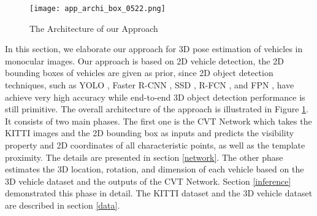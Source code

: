 \begin{figure}[h]		
	\texttt{[image: app\_archi\_box\_0522.png]}
	\caption{The Architecture of our Approach}
	\centering
	\label{figure:app_archi}
\end{figure}

In this section, we elaborate our approach for 3D pose estimation of vehicles in monocular images. Our approach is based on 2D vehicle detection, \ie the 2D bounding boxes of vehicles are given as prior, since 2D object detection techniques, such as YOLO \cite{DBLP:journals/corr/RedmonF16}, Faster R-CNN \cite{DBLP:journals/corr/RenHG015}, SSD \cite{DBLP:journals/corr/LiuAESR15}, R-FCN \cite{DBLP:journals/corr/DaiLHS16}, and FPN \cite{DBLP:journals/corr/LinDGHHB16},  have achieve very high accuracy while  end-to-end 3D object detection performance is still primitive.  The overall architecture of the approach is illustrated in Figure \ref{figure:app_archi}. It consists of two main phases. The first one is the CVT Network which takes the KITTI images and the 2D bounding box as inputs and predicts the visibility property and 2D coordinates of all characteristic points, as well as the template proximity. The details are presented in section \ref{network}.  The other phase estimates the 3D location, rotation, and dimension of each vehicle based on the 3D vehicle dataset and the outputs of the CVT Network. Section \ref{inference} demonstrated this phase in detail. The KITTI dataset and the 3D vehicle dataset are described in section \ref{data}.


